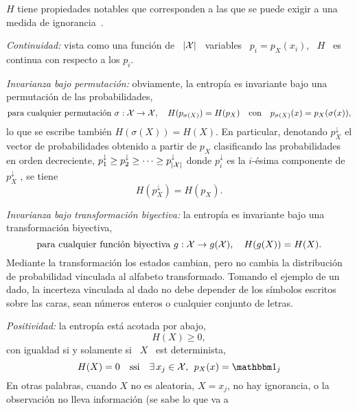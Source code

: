  $H$ tiene propiedades notables que corresponden
a  las que  se puede  exigir a  una medida  de  ignorancia~\cite{Sha48, ShaWea64,
  CovTho06, Rio07, DemCov91, Joh04}.
%
\begin{propiedades}
\item\label{Prop:SZ:continuidad} {\it Continuidad:}  vista como una funci\'on de
  \ $|\mathcal{X}|$ \ variables  \ $p_i = p_X(x_i)$, \ $H$ \  es continua con respecto a
  los $p_i$.
%
\setcounter{PropPermutacion}{\value{enumi}}
\item\label{Prop:SZ:permutacion}   {\it  Invarianza bajo   permutaci\'on:}
  obviamente,  la  entrop\'ia  es  invariante  bajo  una  permutaci\'on  de  las
  probabilidades, \ie
  \[
  \mbox{para   cualquier   permutaci\'on   }   \sigma:   \mathcal{X}   \to   \mathcal{X},   \quad
  H(p_{\sigma(X)})   =  H(p_X)   \quad  \mbox{con}   \quad   p_{\sigma(X)}(x)  =
  p_X(\sigma(x)),
  \]
  lo que se escribe tambi\'en $H(\sigma(X)) = H(X)$.  En particular, denotando
  $p_X^\downarrow$  el  vector de  probabilidades  obtenido  a partir  de  $p_X$
  clasificando  las probabilidades  en  orden  decreciente, $p_1^\downarrow  \ge
  p_2^\downarrow \ge  \cdots \ge p_{|\mathcal{X}|}^\downarrow$ donde  $p_i^\downarrow$ es
  la     $i$-\'esima     componente      de     $p_X^\downarrow$     ,
  se tiene
  \[
  H(p_X^\downarrow) = H(p_X).
  \]
%
\setcounter{PropBiyeccion}{\value{enumi}}
\item\label{Prop:SZ:biyeccion}   {\it  Invarianza   bajo   transformaci\'on
    biyectiva:}   la  entrop\'ia   es  invariante   bajo  una   transformaci\'on
  biyectiva, \ie
  \[
  \mbox{para cualquier  funci\'on biyectiva } g:  \mathcal{X} \to g(\mathcal{X}),  \quad H(g(X)) =
  H(X).
  \]
  Mediante  la  transformaci\'on  los  estados  cambian,  pero  no  cambia  la
  distribuci\'on de probabilidad vinculada al alfabeto transformado.  Tomando el
  ejemplo de  un dado, la  incerteza vinculada al dado  no debe depender  de los
  s\'imbolos  escritos  sobre las  caras,  sean  n\'umeros enteros  o  cualquier
  conjunto de letras.
%
\item\label{Prop:SZ:positividad} {\it Positividad:} la entrop\'ia est\'a acotada por abajo,
  \[
  H(X) \ge 0,
  \]
  con igualdad si y solamente si \ $X$ \ est determinista, \ie
  \[
  H(X)  =  0 \quad  \mbox{ssi}  \quad \exists \, x_j \in \X, \:\: p_X(x) = \un_j
  \]
  En  otras palabras,  cuando $X$  no  es aleatoria,  \ie  $X =  x_j$, no  hay
  ignorancia, o  la observaci\'on no  lleva informaci\'on (se  sabe lo que  va a

\end{propiedades}

